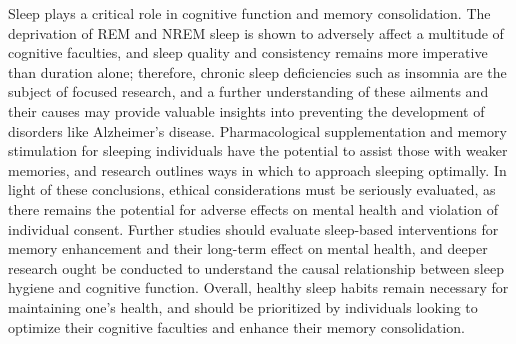 \documentclass[stu, 12pt]{apa7}
\begin{document}
Sleep plays a critical role in cognitive function and memory consolidation. The deprivation of REM and NREM sleep is shown to adversely affect a multitude of cognitive faculties, and sleep quality and consistency remains more imperative than duration alone; therefore, chronic sleep deficiencies such as insomnia are the subject of focused research, and a further understanding of these ailments and their causes may provide valuable insights into preventing the development of disorders like Alzheimer's disease. Pharmacological supplementation and memory stimulation for sleeping individuals have the potential to assist those with weaker memories, and research outlines ways in which to approach sleeping optimally. In light of these conclusions, ethical considerations must be seriously evaluated, as there remains the potential for adverse effects on mental health and violation of individual consent. Further studies should evaluate sleep-based interventions for memory enhancement and their long-term effect on mental health, and deeper research ought be conducted to understand the causal relationship between sleep hygiene and cognitive function. Overall, healthy sleep habits remain necessary for maintaining one's health, and should be prioritized by individuals looking to optimize their cognitive faculties and enhance their memory consolidation.

\printbibliography[title=\textmd{References}]
\end{document}
